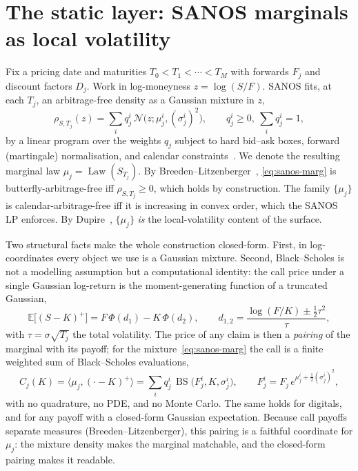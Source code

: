 \documentclass[11pt]{article}
\newcommand{\BS}{\operatorname{BS}}
\newcommand{\E}{\mathbb{E}}
\newcommand{\law}{\operatorname{Law}}
\newcommand{\cN}{\mathcal{N}}
\begin{document}
\section{The static layer: SANOS marginals as local volatility}
\label{sec:marginals}

Fix a pricing date and maturities $T_0<T_1<\cdots<T_M$ with forwards $F_j$ and
discount factors $D_j$. Work in log-moneyness $z=\log(S/F)$. SANOS fits, at each
$T_j$, an arbitrage-free density as a Gaussian mixture in $z$,
\begin{equation}
\rho_{S,T_j}(z)=\sum_{i} q_j^{i}\,\cN\!\big(z;\mu_j^i,(\sigma_j^i)^2\big),
\qquad q_j^i\ge 0,\ \sum_i q_j^i=1,
\label{eq:sanos-marg}
\end{equation}
by a linear program over the weights $q_j$ subject to hard bid--ask boxes,
forward (martingale) normalisation, and calendar constraints~\cite{buehler2026sanos}.
We denote the resulting marginal law $\mu_j=\law(S_{T_j})$. By
Breeden--Litzenberger~\cite{breeden1978},
\eqref{eq:sanos-marg} is butterfly-arbitrage-free iff $\rho_{S,T_j}\ge 0$, which holds
by construction. The family $\{\mu_j\}$ is calendar-arbitrage-free iff it is
increasing in convex order, which the SANOS LP enforces. By
Dupire~\cite{dupire1994}, $\{\mu_j\}$ \emph{is} the local-volatility content of the
surface.

Two structural facts make the whole construction closed-form. First, in
log-coordinates every object we use is a Gaussian mixture. Second, Black--Scholes is
not a modelling assumption but a computational identity: the call price under a
single Gaussian log-return is the moment-generating function of a truncated Gaussian,
\begin{equation}
\E\big[(S-K)^+\big]
= F\,\Phi(d_1)-K\,\Phi(d_2),\qquad
d_{1,2}=\frac{\log(F/K)\pm\tfrac12\tau^2}{\tau},
\label{eq:bs-identity}
\end{equation}
with $\tau=\sigma\sqrt{T_j}$ the total volatility. The price of any claim is then a \emph{pairing} of the
marginal with its payoff; for the mixture~\eqref{eq:sanos-marg} the call is a finite
weighted sum of Black--Scholes evaluations,
\begin{equation}
C_j(K)=\big\langle\mu_j,(\cdot-K)^+\big\rangle
=\sum_i q_j^i\,\BS\!\big(F_j^i,K,\sigma_j^i\big),\qquad
F_j^i=F_j\,e^{\mu_j^i+\frac12(\sigma_j^i)^2},
\label{eq:mix-price}
\end{equation}
with no quadrature, no PDE, and no Monte Carlo. The same holds for digitals, and for any payoff
with a closed-form Gaussian expectation. Because call payoffs separate measures
(Breeden--Litzenberger), this pairing is a faithful coordinate for $\mu_j$: the mixture
density makes the marginal matchable, and the closed-form pairing makes it readable.
\end{document}
